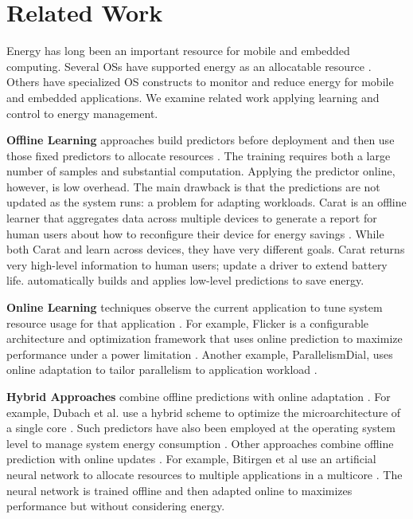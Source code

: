 \section{Related Work}
Energy has long been an important resource for mobile and embedded
computing.  Several OSs have supported energy as an allocatable
resource \cite{Koala,Cinder,PowerContainers}.  Others have specialized
OS constructs to monitor \cite{quanto} and reduce
\cite{JouleGuard,flinn99,grace,grace2,Drowsy} energy for mobile and
embedded applications. We examine related work applying learning and
control to energy management.


\noindent \textbf{Offline Learning} approaches build predictors before
deployment and then use those fixed predictors to allocate resources
\cite{Yi2003,LeeBrooks2006,CPR,ChenJohn2011,petabricksStatic}.  The
training requires both a large number of samples and substantial
computation.  Applying the predictor online, however, is low overhead.
The main drawback is that the predictions are not updated as the
system runs: a problem for adapting workloads.  Carat is an offline
learner that aggregates data across multiple devices to generate a
report for human users about how to reconfigure their device for
energy savings \cite{carat}.  While both Carat and \SYSTEM{} learn
across devices, they have very different goals.  Carat returns very
high-level information to human users; \eg{} update a driver to extend
battery life.  \SYSTEM{} automatically builds and applies low-level
predictions to save energy.

\noindent \textbf{Online Learning} techniques observe the current
application to tune system resource usage for that application
\cite{Li2006,Flicker,ParallelismDial,Ponamarev,petabricksDynamic,LeeBrooks}.
For example, Flicker is a configurable architecture and optimization
framework that uses online prediction to maximize performance under a
power limitation \cite{Flicker}.  Another example, ParallelismDial,
uses online adaptation to tailor parallelism to application workload
\cite{ParallelismDial}.



\noindent \textbf{Hybrid Approaches} combine offline predictions with
online adaptation
\cite{Zhang2012,packandcap,Winter2010,dubach2010,Koala,Cinder,
  wu2012inferred}.  For example, Dubach et al.  use a hybrid scheme to
optimize the microarchitecture of a single core \cite{dubach2010}.
Such predictors have also been employed at the operating system level
to manage system energy consumption
\cite{Koala,Cinder,wu2012inferred}.  Other approaches combine offline
prediction with online updates \cite{JouleGuard,Bitirgen2008,Ipek}.
For example, Bitirgen et al use an artificial neural network to
allocate resources to multiple applications in a multicore
\cite{Bitirgen2008}.  The neural network is trained offline and then
adapted online to maximizes performance but without considering
energy.


